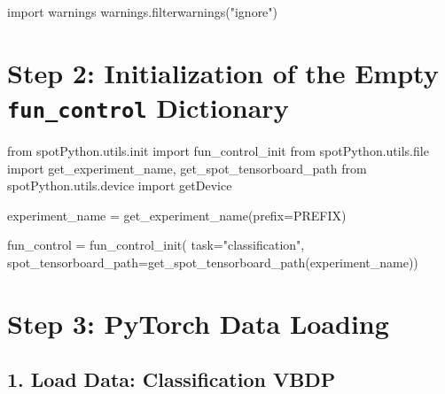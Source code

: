 \documentclass[
  letterpaper,
  DIV=11,
  numbers=noendperiod]{scrreprt}
\newenvironment{Shaded}{\begin{snugshade}}{\end{snugshade}}
\newcommand{\BuiltInTok}[1]{\textcolor[rgb]{0.00,0.23,0.31}{#1}}
\newcommand{\ImportTok}[1]{\textcolor[rgb]{0.00,0.46,0.62}{#1}}
\newcommand{\NormalTok}[1]{\textcolor[rgb]{0.00,0.23,0.31}{#1}}
\newcommand{\OperatorTok}[1]{\textcolor[rgb]{0.37,0.37,0.37}{#1}}
\newcommand{\StringTok}[1]{\textcolor[rgb]{0.13,0.47,0.30}{#1}}
\begin{document}
\begin{Shaded}
\begin{Highlighting}[]
\ImportTok{import}\NormalTok{ warnings}
\NormalTok{warnings.filterwarnings(}\StringTok{"ignore"}\NormalTok{)}
\end{Highlighting}
\end{Shaded}

\hypertarget{step-2-initialization-of-the-empty-fun_control-dictionary-3}{%
\section{\texorpdfstring{Step 2: Initialization of the Empty
\texttt{fun\_control}
Dictionary}{Step 2: Initialization of the Empty fun\_control Dictionary}}\label{step-2-initialization-of-the-empty-fun_control-dictionary-3}}

\begin{Shaded}
\begin{Highlighting}[]
\ImportTok{from}\NormalTok{ spotPython.utils.init }\ImportTok{import}\NormalTok{ fun\_control\_init}
\ImportTok{from}\NormalTok{ spotPython.utils.}\BuiltInTok{file} \ImportTok{import}\NormalTok{ get\_experiment\_name, get\_spot\_tensorboard\_path}
\ImportTok{from}\NormalTok{ spotPython.utils.device }\ImportTok{import}\NormalTok{ getDevice}

\NormalTok{experiment\_name }\OperatorTok{=}\NormalTok{ get\_experiment\_name(prefix}\OperatorTok{=}\NormalTok{PREFIX)}

\NormalTok{fun\_control }\OperatorTok{=}\NormalTok{ fun\_control\_init(}
\NormalTok{    task}\OperatorTok{=}\StringTok{"classification"}\NormalTok{,}
\NormalTok{    spot\_tensorboard\_path}\OperatorTok{=}\NormalTok{get\_spot\_tensorboard\_path(experiment\_name))}
\end{Highlighting}
\end{Shaded}

\hypertarget{step-3-pytorch-data-loading-1}{%
\section{Step 3: PyTorch Data
Loading}\label{step-3-pytorch-data-loading-1}}

\hypertarget{load-data-classification-vbdp-2}{%
\subsection{1. Load Data: Classification
VBDP}\label{load-data-classification-vbdp-2}}
\end{document}
